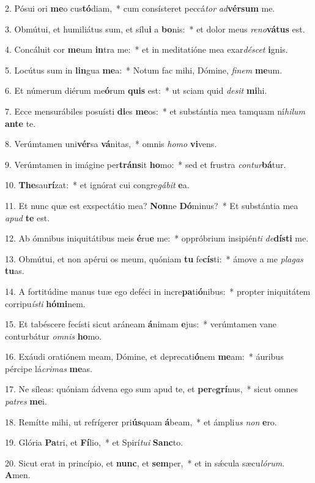 2. Pósui ori \textbf{me}o cus\textbf{tó}diam,~*  cum consísteret peccá\textit{tor} \textit{ad}\textbf{vér}\textbf{sum} me.\

3. Obmútui, et humiliátus sum, et sílu\textbf{i} a \textbf{bo}nis:~*  et dolor meus \textit{re}\textit{no}\textbf{vá}\textbf{tus} est.\

4. Concáluit cor \textbf{me}um \textbf{in}tra me:~*  et in meditatióne mea exar\textit{dé}\textit{scet} \textbf{i}gnis.\

5. Locútus sum in \textbf{lin}gua \textbf{me}a:~*  Notum fac mihi, Dómine, \textit{fi}\textit{nem} \textbf{me}um.\

6. Et númerum diérum me\textbf{ó}rum \textbf{quis} est:~*  ut sciam quid \textit{de}\textit{sit} \textbf{mi}hi.\

7. Ecce mensurábiles posuísti \textbf{di}es \textbf{me}os:~*  et substántia mea tamquam ní\textit{hi}\textit{lum} \textbf{an}\textbf{te} te.\

8. Verúmtamen uni\textbf{vér}sa \textbf{vá}nitas,~*  omnis \textit{ho}\textit{mo} \textbf{vi}vens.\

9. Verúmtamen in imágine per\textbf{tráns}it \textbf{ho}mo:~*  sed et frustra \textit{con}\textit{tur}\textbf{bá}tur.\

10. \textbf{The}sau\textbf{rí}zat:~*  et ignórat cui congre\textit{gá}\textit{bit} \textbf{e}a.\

11. Et nunc quæ est exspectátio mea? \textbf{Non}ne \textbf{Dó}minus?~*  Et substántia mea \textit{a}\textit{pud} \textbf{te} est.\

12. Ab ómnibus iniquitátibus meis \textbf{é}ru\textbf{e} me:~*  oppróbrium insipién\textit{ti} \textit{de}\textbf{dís}\textbf{ti} me.\

13. Obmútui, et non apérui os meum, quóniam \textbf{tu} fe\textbf{cís}ti:~*  ámove a me \textit{pla}\textit{gas} \textbf{tu}as.\

14. A fortitúdine manus tuæ ego deféci in incre\textbf{pa}ti\textbf{ó}nibus:~*  propter iniquitátem corripu\textit{ís}\textit{ti} \textbf{hó}\textbf{mi}nem.\

15. Et tabéscere fecísti sicut aráneam \textbf{á}nimam \textbf{e}jus:~*  verúmtamen vane conturbátur \textit{om}\textit{nis} \textbf{ho}mo.\

16. Exáudi oratiónem meam, Dómine, et deprecati\textbf{ó}nem \textbf{me}am:~*  áuribus pércipe lá\textit{cri}\textit{mas} \textbf{me}as.\

17. Ne síleas: quóniam ádvena ego sum apud te, et \textbf{per}e\textbf{grí}nus,~*  sicut omnes \textit{pa}\textit{tres} \textbf{me}i.\

18. Remítte mihi, ut refrígerer pri\textbf{ús}quam \textbf{á}beam,~*  et ámpli\textit{us} \textit{non} \textbf{e}ro.\

19. Glória \textbf{Pa}tri, et \textbf{Fí}lio,~*  et Spirí\textit{tu}\textit{i} \textbf{Sanc}to.\

20. Sicut erat in princípio, et \textbf{nunc}, et \textbf{sem}per,~*  et in sǽcula sæcu\textit{ló}\textit{rum}. \textbf{A}men.\

